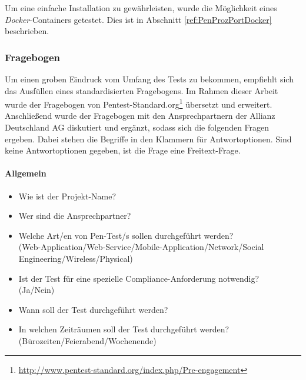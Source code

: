 Um eine einfache Installation zu gewährleisten, wurde die Möglichkeit eines \textit{Docker}-Containers getestet. Dies ist in Abschnitt \ref{ref:PenProzPortDocker} beschrieben.

\subsubsection{Fragebogen}\label{ref:KategorienUndFragen}
Um einen groben Eindruck vom Umfang des Tests zu bekommen, empfiehlt sich das Ausfüllen eines standardisierten Fragebogens. Im Rahmen dieser Arbeit wurde der Fragebogen von Pentest-Standard.org\footnote{\url{http://www.pentest-standard.org/index.php/Pre-engagement}} übersetzt und erweitert. Anschließend wurde der Fragebogen mit den Ansprechpartnern der Allianz Deutschland AG diskutiert und ergänzt, sodass sich die folgenden Fragen ergeben. Dabei stehen die Begriffe in den Klammern für Antwortoptionen. Sind keine Antwortoptionen gegeben, ist die Frage eine Freitext-Frage.

\paragraph{Allgemein}
\begin{itemize}
	\item Wie ist der Projekt-Name?
	\item Wer sind die Ansprechpartner?
	\item Welche Art/en von Pen-Test/s sollen durchgeführt werden? \\
	(Web-Application/Web-Service/Mobile-Application/Network/Social Engineering/Wireless/Physical)
	\item Ist der Test für eine spezielle Compliance-Anforderung notwendig?\\
	(Ja/Nein)
	\item Wann soll der Test durchgeführt werden?
	\item In welchen Zeiträumen soll der Test durchgeführt werden?\\
	(Bürozeiten/Feierabend/Wochenende)
\end{itemize}

